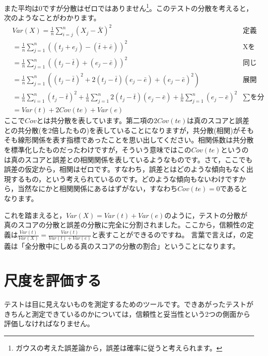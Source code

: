 \documentclass{ltjsbook}
\begin{document}
また平均は$0$ですが分散はゼロではありません\footnote{ガウスの考えた誤差論から，誤差は確率に従うと考えられます。}。このテストの分散を考えると，次のようなことがわかります。
\begin{align*}
     & Var(X)  =  \frac{1}{n}\sum_{i=j}^n (X_j - \bar{X})^2                                                                                              & \mbox{定義より}         \\
     & = \frac{1}{n}\sum_{j=1}^n  ((t_j + e_j) - (\bar{t} + \bar{e}))^2                                                                                  & \mbox{Xをテスト理論のモデルに} \\
     & = \frac{1}{n}\sum_{j=1}^n (  (t_j - \bar{t}) + (e_j - \bar{e}) )^2                                                                                & \mbox{同じ記号でまとめる}    \\
     & = \frac{1}{n}\sum_{j=1}^n (  (t_j - \bar{t})^2 + 2(t_j - \bar{t})(e_j - \bar{e}) + (e_j - \bar{e})^2  )                                           & \mbox{展開する}         \\
     & = \frac{1}{n}\sum_{i=1}^n (t_j - \bar{t})^2 +\frac{1}{n}\sum_{j=1}^n 2(t_j - \bar{t})(e_j - \bar{e})  + \frac{1}{n}\sum_{j=1}^n (e_j - \bar{e})^2 & \mbox{$\sum$を分配}    \\
     & =  Var(t) + 2Cov(te) + Var(e)
\end{align*}
ここで$Cov$とは共分散を表しています。第二項の$2Cov(te)$は真のスコアと誤差との共分散(を2倍したもの)を表していることになりますが，共分散(相関)がそもそも線形関係を表す指標であったことを思い出してください。相関係数は共分散を標準化したものだったわけですが，そういう意味ではこの$Cov(te)$というのは真のスコアと誤差との相関関係を表しているようなものです。さて，ここでも誤差の仮定から，相関はゼロです。すなわち，誤差とはどのような傾向もなく出現するもの，という考えられているのです。どのような傾向もないわけですから，当然なにかと相関関係にあるはずがない，すなわち$Cov(te)=0$であるとなります。

これを踏まえると，$Var(X)=Var(t)+Var(e)$のように，テストの分散が真のスコアの分散と誤差の分散に完全に分割されました。ここから，信頼性の定義は$\frac{Var(t)}{Var(X)}=\frac{Var(t)}{Var(t)+Var(e)}$と表すことができるのですね。
言葉で言えば，の定義は「全分散中にしめる真のスコアの分散の割合」ということになります。

\section{尺度を評価する}
テストは目に見えないものを測定するためのツールです。できあがったテストがきちんと測定できているのかについては，信頼性と妥当性という2つの側面から評価しなければなりません。
\end{document}
